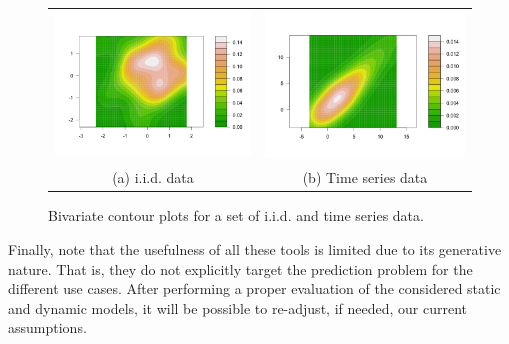 \begin{itemize}
\begin{figure} [ht!]
\begin{center}
\begin{tabular}{cc}
\includegraphics[scale=0.25]{./figures/PreliminariesBivariateGaussian} &
\includegraphics[scale=0.25]{./figures/PreliminariesBivariateTimeSerie} \\
(a) i.i.d. data & (b)  Time series data \\
\end{tabular}
\caption{\label{Figure:PreliminariesBivariates}Bivariate contour plots for a set of i.i.d. and time series data. 
}
\end{center}
\end{figure}

\end{itemize}

Finally, note that the usefulness of all these tools is limited due to its generative nature. That is, they do not explicitly target the prediction problem for the different use cases. After performing a proper evaluation of the considered static and dynamic models, it will be possible to re-adjust, if needed, our current assumptions. 
